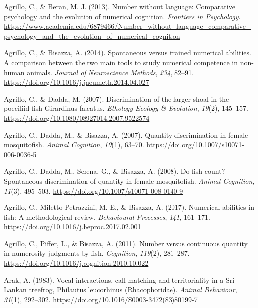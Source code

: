 \documentclass[
  ,pub,floatsintext]{apa6}
\newlength{\cslhangindent}
\newlength{\cslentryspacingunit} %
\newenvironment{CSLReferences}[2] %
 {%
  \setlength{\parindent}{0pt}
  \ifodd #1
  \let\oldpar\par
  \def\par{\hangindent=\cslhangindent\oldpar}
  \fi
  \setlength{\parskip}{#2\cslentryspacingunit}
 }%
 {}
\begin{document}
\hypertarget{refs}{}
\begin{CSLReferences}{1}{0}
\leavevmode{}%
Agrillo, C., \& Beran, M. J. (2013). Number without language: Comparative psychology and the evolution of numerical cognition. \emph{Frontiers in Psychology}. \url{https://www.academia.edu/6879466/Number_without_language_comparative_psychology_and_the_evolution_of_numerical_cognition}

\leavevmode{}%
Agrillo, C., \& Bisazza, A. (2014). Spontaneous versus trained numerical abilities. {A} comparison between the two main tools to study numerical competence in non-human animals. \emph{Journal of Neuroscience Methods}, \emph{234}, 82--91. \url{https://doi.org/10.1016/j.jneumeth.2014.04.027}

\leavevmode{}%
Agrillo, C., \& Dadda, M. (2007). Discrimination of the larger shoal in the poeciliid fish {Girardinus} falcatus. \emph{Ethology Ecology \& Evolution}, \emph{19}(2), 145--157. \url{https://doi.org/10.1080/08927014.2007.9522574}

\leavevmode{}%
Agrillo, C., Dadda, M., \& Bisazza, A. (2007). Quantity discrimination in female mosquitofish. \emph{Animal Cognition}, \emph{10}(1), 63--70. \url{https://doi.org/10.1007/s10071-006-0036-5}

\leavevmode{}%
Agrillo, C., Dadda, M., Serena, G., \& Bisazza, A. (2008). Do fish count? {Spontaneous} discrimination of quantity in female mosquitofish. \emph{Animal Cognition}, \emph{11}(3), 495--503. \url{https://doi.org/10.1007/s10071-008-0140-9}

\leavevmode{}%
Agrillo, C., Miletto Petrazzini, M. E., \& Bisazza, A. (2017). Numerical abilities in fish: {A} methodological review. \emph{Behavioural Processes}, \emph{141}, 161--171. \url{https://doi.org/10.1016/j.beproc.2017.02.001}

\leavevmode{}%
Agrillo, C., Piffer, L., \& Bisazza, A. (2011). Number versus continuous quantity in numerosity judgments by fish. \emph{Cognition}, \emph{119}(2), 281--287. \url{https://doi.org/10.1016/j.cognition.2010.10.022}

\leavevmode{}%
Arak, A. (1983). Vocal interactions, call matching and territoriality in a {Sri Lankan} treefrog, {Philautus} leucorhinus ({Rhacophoridae}). \emph{Animal Behaviour}, \emph{31}(1), 292--302. \url{https://doi.org/10.1016/S0003-3472(83)80199-7}


\end{CSLReferences}
\end{document}
